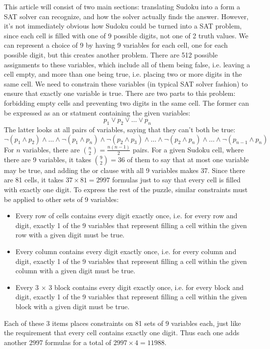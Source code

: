 \documentclass{article}
\begin{document}
This article will consist of two main sections:
translating Sudoku into a form a SAT solver can recognize,
and how the solver actually finds the answer.
However, it's not immediately obvious
how Sudoku could be turned into a SAT problem,
since each cell is filled with one of 9 possible digits,
not one of 2 truth values.
We can represent a choice of 9 by having 9 variables for each cell,
one for each possible digit,
but this creates another problem.
There are 512 possible assignments to these variables,
which include all of them being false, i.e. leaving a cell empty,
and more than one being true, i.e. placing two or more digits in the same cell.
We need to constrain these variables (in typical SAT solver fashion)
to ensure that exactly one variable is true.
There are two parts to this problem: forbidding empty cells
and preventing two digits in the same cell.
The former can be expressed as an or statment containing the given variables:
\[p_1 \lor p_2 \lor \ldots \lor p_n\]
The latter looks at all pairs of variables,
saying that they can't both be true:
\[\lnot (p_1 \land p_2) \land \ldots \land \lnot (p_1 \land p_n)
\land \lnot (p_2 \land p_3) \land \ldots \land \lnot (p_2 \land p_n) \land \ldots
\land \lnot (p_{n-1} \land p_n)\]
For $n$ variables, there are $\binom{n}{2} = \frac{n(n-1)}{2}$ pairs.
For a given Sudoku cell, where there are 9 variables,
it takes $\binom{9}{2} = 36$ of them
to say that at most one variable may be true,
and adding the or clause with all 9 variables makes 37.
Since there are 81 cells,
it takes $37 \times 81 = 2997$ formulas
just to say that every cell is filled with exactly one digit.
To express the rest of the puzzle,
similar constraints must be applied to other sets of 9 variables:
\begin{itemize}
\item
  Every row of cells contains every digit exactly once,
  i.e. for every row and digit,
  exactly 1 of the 9 variables that represent
  filling a cell within the given row with a given digit
  must be true.
\item
  Every column contains every digit exactly once,
  i.e. for every column and digit,
  exactly 1 of the 9 variables that represent
  filling a cell within the given column with a given digit
  must be true.
\item
  Every 3 $\times$ 3 block contains every digit exactly once,
  i.e. for every block and digit,
  exactly 1 of the 9 variables that represent
  filling a cell within the given block with a given digit
  must be true.
\end{itemize}
Each of these 3 items places constraints on 81 sets of 9 variables each,
just like the requirement that every cell contains exactly one digit.
Thus each one adds another 2997 formulas
for a total of $2997 \times 4 = 11988$.
\end{document}
